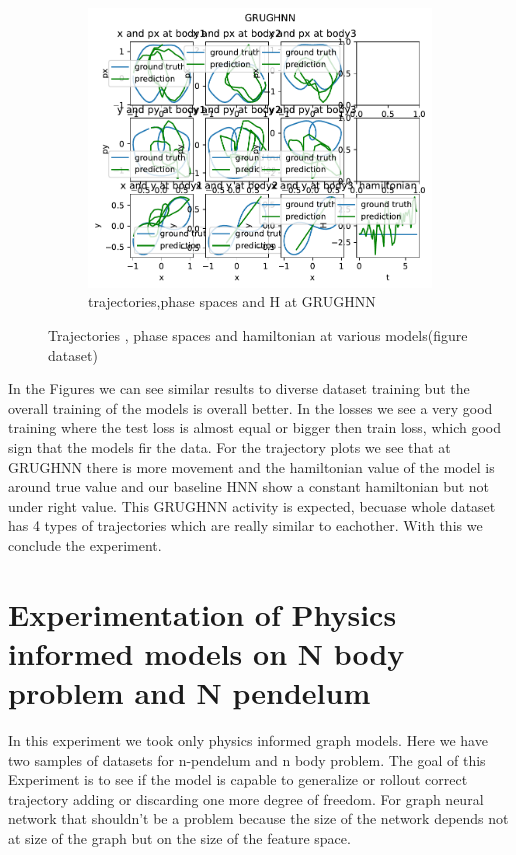 \begin{figure}[H]
\begin{subfigure}[b]{0.3\textwidth}
	\end{subfigure}
	\hfill
	\begin{subfigure}[b]{0.3\textwidth}
		\centering
		\includegraphics[width=\textwidth]{chapters/chapter5/fig_grughnn_traj.pdf}
		\caption{trajectories,phase spaces and H at GRUGHNN}
	\end{subfigure}
	
	\caption{Trajectories , phase spaces and hamiltonian at various models(figure dataset)}
	\label{fig_traj}
\end{figure}
In the Figures we can see similar results to diverse dataset training but the overall training of the models is overall better. In the losses we see a very good training where the test loss is almost equal or bigger then train loss, which good sign that the models fir the data. For the trajectory plots we see that at GRUGHNN there is more movement  and the hamiltonian value of the model is around true value and our baseline HNN show a constant hamiltonian but not under right value. This GRUGHNN activity is expected, becuase whole dataset has 4 types of trajectories which are really similar to eachother. With this we conclude the experiment.



\section{Experimentation of Physics informed models on N body problem and N pendelum}
In this experiment we took only physics informed graph models. Here we have two samples of datasets for n-pendelum and n body problem. The goal of this Experiment is to see if the model is capable to generalize or rollout correct trajectory adding or discarding one more degree of freedom. For graph neural network that shouldn't be a problem because the size of the network depends not at size of the graph but on the size of the feature space.

